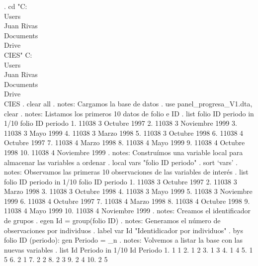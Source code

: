 . cd "C:\\Users\\Juan Rivas\\Documents\\Drive\\CIES"
C:\\Users\\Juan Rivas\\Documents\\Drive\\CIES
{\smallskip}
. clear all 
{\smallskip}
. notes: Cargamos la base de datos
{\smallskip}
. use panel_progresa_V1.dta, clear 
{\smallskip}
. notes: Listamos los primeros 10 datos de folio e ID
{\smallskip}
. list  folio ID periodo in 1/10
{\smallskip}
     {\TLC}
     {\VBAR} folio   ID          periodo {\VBAR}
     {\LFTT}
  1. {\VBAR} 11038    3     Octubre 1997 {\VBAR}
  2. {\VBAR} 11038    3   Noviembre 1999 {\VBAR}
  3. {\VBAR} 11038    3        Mayo 1999 {\VBAR}
  4. {\VBAR} 11038    3       Marzo 1998 {\VBAR}
  5. {\VBAR} 11038    3     Octubre 1998 {\VBAR}
     {\LFTT}
  6. {\VBAR} 11038    4     Octubre 1997 {\VBAR}
  7. {\VBAR} 11038    4       Marzo 1998 {\VBAR}
  8. {\VBAR} 11038    4        Mayo 1999 {\VBAR}
  9. {\VBAR} 11038    4     Octubre 1998 {\VBAR}
 10. {\VBAR} 11038    4   Noviembre 1999 {\VBAR}
     {\BLC}
{\smallskip}
. notes: Construímos una variable local para almacenar las variables a ordenar
{\smallskip}
. local vars "folio ID periodo"
{\smallskip}
. sort `vars'
{\smallskip}
. notes: Observamos las primeras 10 observaciones de las variables de interés
{\smallskip}
. list  folio ID periodo in 1/10
{\smallskip}
     {\TLC}
     {\VBAR} folio   ID          periodo {\VBAR}
     {\LFTT}
  1. {\VBAR} 11038    3     Octubre 1997 {\VBAR}
  2. {\VBAR} 11038    3       Marzo 1998 {\VBAR}
  3. {\VBAR} 11038    3     Octubre 1998 {\VBAR}
  4. {\VBAR} 11038    3        Mayo 1999 {\VBAR}
  5. {\VBAR} 11038    3   Noviembre 1999 {\VBAR}
     {\LFTT}
  6. {\VBAR} 11038    4     Octubre 1997 {\VBAR}
  7. {\VBAR} 11038    4       Marzo 1998 {\VBAR}
  8. {\VBAR} 11038    4     Octubre 1998 {\VBAR}
  9. {\VBAR} 11038    4        Mayo 1999 {\VBAR}
 10. {\VBAR} 11038    4   Noviembre 1999 {\VBAR}
     {\BLC}
{\smallskip}
. notes: Creamos el identificador de grupos
{\smallskip}
. egen Id = group(folio ID)
{\smallskip}
. notes: Generamos el número de observaciones por individuos
{\smallskip}
. label var Id "Identidicador por individuos"
{\smallskip}
. bys folio ID (periodo): gen Periodo = _n
{\smallskip}
. notes: Volvemos a listar la base con las nuevas variables
{\smallskip}
. list  Id Periodo in 1/10
{\smallskip}
     {\TLC}
     {\VBAR} Id   Periodo {\VBAR}
     {\LFTT}
  1. {\VBAR}  1         1 {\VBAR}
  2. {\VBAR}  1         2 {\VBAR}
  3. {\VBAR}  1         3 {\VBAR}
  4. {\VBAR}  1         4 {\VBAR}
  5. {\VBAR}  1         5 {\VBAR}
     {\LFTT}
  6. {\VBAR}  2         1 {\VBAR}
  7. {\VBAR}  2         2 {\VBAR}
  8. {\VBAR}  2         3 {\VBAR}
  9. {\VBAR}  2         4 {\VBAR}
 10. {\VBAR}  2         5 {\VBAR}
     {\BLC}
{\smallskip}
